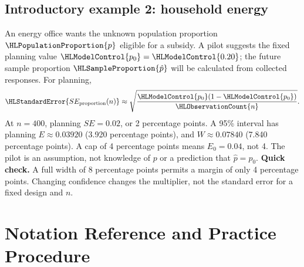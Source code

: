 \subsection{Introductory example 2: household energy}\label{ex:intro-two}
An energy office wants the unknown population proportion $\HLPopulationProportion{p}$ eligible for a subsidy. A pilot suggests the fixed planning value $\HLModelControl{p_0}=\HLModelControl{0.20}$; the future sample proportion $\HLSampleProportion{\hat p}$ will be calculated from collected responses. For planning,
\[
\HLStandardError{SE_{\rm proportion}(n)}\approx
\sqrt{\frac{\HLModelControl{p_0}(1-\HLModelControl{p_0})}{\HLObservationCount{n}}}.
\]
At $n=400$, planning $SE=0.02$, or 2 percentage points. A 95\% interval has planning $E\approx0.03920$ (3.920 percentage points), and $W\approx0.07840$ (7.840 percentage points). A cap of 4 percentage points means $E_0=0.04$, not 4. The pilot is an assumption, not knowledge of $p$ or a prediction that $\hat p=p_0$.
\textbf{Quick check.} A full width of 8 percentage points permits a margin of only 4 percentage points. Changing confidence changes the multiplier, not the standard error for a fixed design and $n$.
\clearpage
\section{Notation Reference and Practice Procedure}\label{sec:notation-and-procedure}
